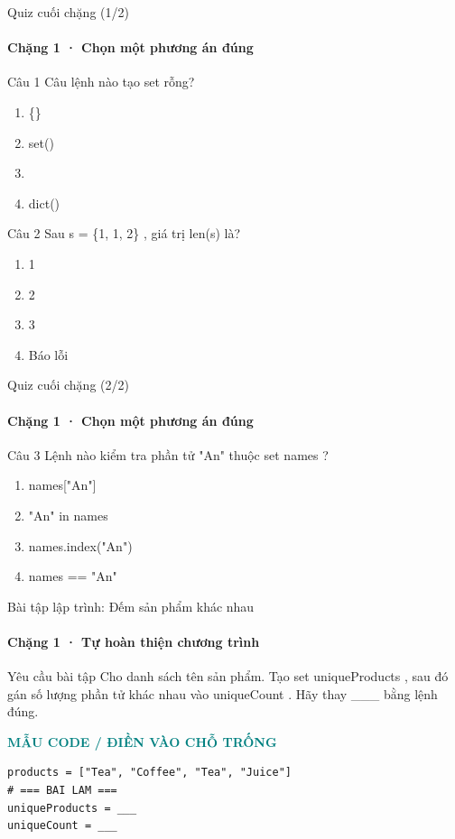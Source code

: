 \documentclass[aspectratio=169,10pt]{beamer}
\begin{document}
\begin{frame}[t]{Quiz cuối chặng (1/2)}
\framesubtitle{Chặng 1 · Chọn một phương án đúng}
\small
\begin{block}{Câu 1}
Câu lệnh nào tạo set rỗng?\par\smallskip
\begin{enumerate}
\item \{\}
\item set()
\item []
\item dict()
\end{enumerate}
\end{block}
\begin{block}{Câu 2}
Sau s = \{1, 1, 2\} , giá trị len(s) là?\par\smallskip
\begin{enumerate}
\item 1
\item 2
\item 3
\item Báo lỗi
\end{enumerate}
\end{block}

\end{frame}

\begin{frame}[t]{Quiz cuối chặng (2/2)}
\framesubtitle{Chặng 1 · Chọn một phương án đúng}
\small
\begin{block}{Câu 3}
Lệnh nào kiểm tra phần tử "An" thuộc set names ?\par\smallskip
\begin{enumerate}
\item names["An"]
\item "An" in names
\item names.index("An")
\item names == "An"
\end{enumerate}
\end{block}

\end{frame}

\begin{frame}[fragile,t]{Bài tập lập trình: Đếm sản phẩm khác nhau}
\framesubtitle{Chặng 1 · Tự hoàn thiện chương trình}
\begin{block}{Yêu cầu bài tập}
Cho danh sách tên sản phẩm. Tạo set uniqueProducts , sau đó gán số lượng phần tử khác nhau vào uniqueCount . Hãy thay \_\_\_ bằng lệnh đúng.
\end{block}
\textcolor{teal}{\scriptsize\textbf{MẪU CODE / ĐIỀN VÀO CHỖ TRỐNG}}\par
\begin{Verbatim}[fontsize=\scriptsize,frame=single,framesep=3mm,rulecolor=\color{teal!35},breaklines=true]
products = ["Tea", "Coffee", "Tea", "Juice"]
# === BAI LAM ===
uniqueProducts = ___
uniqueCount = ___
\end{Verbatim}
\end{frame}
\end{document}
